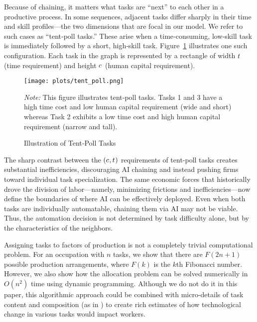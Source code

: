 \documentclass{article}
\theoremstyle{plain}
\theoremstyle{plain}
\begin{document}
Because of chaining, it matters what tasks are ``next'' to each other in a productive process.
In some sequences, adjacent tasks differ sharply in their time and skill profiles---the two dimensions that are focal in our model.
We refer to such cases as ``tent‐poll tasks.''
These arise when a time‐consuming, low‐skill task is immediately followed by a short, high‐skill task.
Figure~\ref{fig:tent_poll} illustrates one such configuration.
Each task in the graph is represented by a rectangle of width $t_{}$ (time requirement) and height $c_{}$ (human capital requirement).
\begin{figure}[h]
  \caption{Illustration of Tent‐Poll Tasks} 
  \label{fig:tent_poll}
  \begin{center}
    \texttt{[image: plots/tent\_poll.png]}
  \end{center}
  \begin{footnotesize}
    \emph{Note:} This figure illustrates tent‐poll tasks.  
    Tasks 1 and 3 have a high time cost and low human capital requirement (wide and short) whereas Task 2 exhibits a low time cost and high human capital requirement (narrow and tall).  
  \end{footnotesize}
\end{figure}
The sharp contrast between the $(c_{}, t_{})$ requirements of tent-poll tasks creates substantial inefficiencies, discouraging AI chaining and instead pushing firms toward individual task specialization.
The same economic forces that historically drove the division of labor---namely, minimizing frictions and inefficiencies---now define the boundaries of where AI can be effectively deployed.
Even when both tasks are individually automatable, chaining them via AI may not be viable.
Thus, the automation decision is not determined by task difficulty alone, but by the characteristics of the neighbors.

Assigning tasks to factors of production is not a completely trivial computational problem.
For an occupation with $n$ tasks, we show that there are $F(2n + 1)$ possible production arrangements, where $F(k)$ is the $k$th Fibonacci number.
However, we also show how the allocation problem can be solved numerically in $O(n^2)$ time using dynamic programming.
Although we do not do it in this paper, this algorithmic approach could be combined with micro-details of task content and composition (as in \cite{frey2017future, felten2021occupational, eloundou2023gpts}) to create rich estimates of how technological change in various tasks would impact workers.
\end{document}
